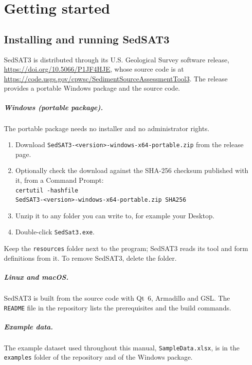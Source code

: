 \documentclass[12pt]{report}
\begin{document}
\tableofcontents
\listoffigures




\chapter{Getting started}\label{chap:getting-started}

\section{Installing and running SedSAT3}\label{sec:installing}
SedSAT3 is distributed through its U.S. Geological Survey software release, \url{https://doi.org/10.5066/P1JF4HJE}, whose source code is at \url{https://code.usgs.gov/cpwsc/SedimentSourceAssessmentTool3}. The release provides a portable Windows package and the source code.

\paragraph{Windows (portable package).} The portable package needs no installer and no administrator rights.
\begin{enumerate}
    \item Download \texttt{SedSAT3-<version>-windows-x64-portable.zip} from the release page.
    \item Optionally check the download against the SHA-256 checksum published with it, from a Command Prompt:\\ \texttt{certutil -hashfile}\\ \texttt{SedSAT3-<version>-windows-x64-portable.zip SHA256}
    \item Unzip it to any folder you can write to, for example your Desktop.
    \item Double-click \texttt{SedSat3.exe}.
\end{enumerate}
Keep the \texttt{resources} folder next to the program; SedSAT3 reads its tool and form definitions from it. To remove SedSAT3, delete the folder.

\paragraph{Linux and macOS.} SedSAT3 is built from the source code with Qt~6, Armadillo and GSL. The \texttt{README} file in the repository lists the prerequisites and the build commands.

\paragraph{Example data.} The example dataset used throughout this manual, \texttt{SampleData.xlsx}, is in the \texttt{examples} folder of the repository and of the Windows package.
\end{document}
